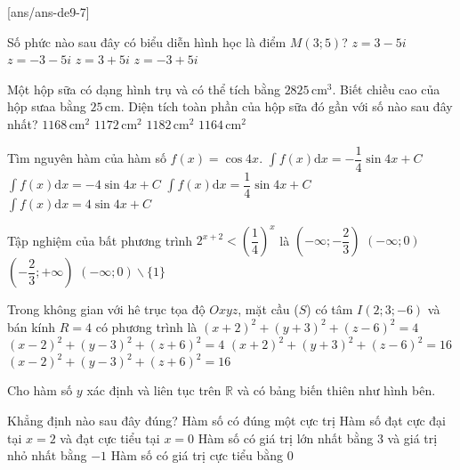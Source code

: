 
\begin{name}
	{\tenchude}
	{\tendethi}
	{\tentruong}
	{\thoigian}
\end{name}
[ans/ans-de9-7]

\begin{ex}%
Số phức nào sau đây có biểu diễn hình học là điểm $M(3; 5)$?
\choice
{$z=3-5 i$}
{$z=-3-5 i$}
{\True $z=3+5 i$}
{$z=-3+5 i$}

\end{ex}
\begin{ex}%
Một hộp sữa có dạng hình trụ và có thể tích bằng $2825\mathrm{\,cm}^3$. Biết chiều cao của hộp sưaa bằng $25\mathrm{\,cm}$. Diện tích toàn phần của hộp sữa đó gần với số nào sau đây nhất?
\choice
{\True $1168\mathrm{\,cm}^2$}
{$1172\mathrm{\,cm}^2$}
{$1182\mathrm{\,cm}^2$}
{$1164\mathrm{\,cm}^2$}

\end{ex}
\begin{ex}%
Tìm nguyên hàm của hàm số $f(x)=\cos 4 x$.
\choice
{$\displaystyle\int f(x) \mathrm{d} x=-\dfrac{1}{4} \sin 4 x+C$}
{$\displaystyle\int f(x) \mathrm{d} x=-4\sin 4 x+C$}
{\True $\displaystyle\int f(x) \mathrm{d} x=\dfrac{1}{4} \sin 4 x+C$}
{$\displaystyle\int f(x) \mathrm{d} x=4\sin 4 x+C$}

\end{ex}
\begin{ex}%
Tập nghiệm của bất phương trình $2^{x+2}<\left(\dfrac{1}{4}\right)^{x}$ là
\choice
{\True $\left(-\infty;-\dfrac{2}{3}\right)$}
{$(-\infty; 0)$}
{$\left(-\dfrac{2}{3};+\infty\right)$}
{$(-\infty; 0) \backslash\{1\}$}

\end{ex}
\begin{ex}%
Trong không gian với hê trục tọa độ $O x y z$, mặt cầu ($S$) có tâm $I(2; 3;-6)$ và bán kính $R=4$ có phương trình là
\choice
{$(x+2)^2+(y+3)^2+(z-6)^2=4$}
{$(x-2)^2+(y-3)^2+(z+6)^2=4$}
{$(x+2)^2+(y+3)^2+(z-6)^2=16$}
{\True $(x-2)^2+(y-3)^2+(z+6)^2=16$}

\end{ex}
\begin{ex}%
Cho hàm số $y$ xác định và liên tục trên $\mathbb{R}$ và có bảng biến thiên như hình bên. 
\begin{center}
\end{center}

Khẳng định nào sau đây đúng?
\choice
{Hàm số có đúng một cực trị}
{\True Hàm số đạt cực đại tại $x=2$ và đạt cực tiểu tại $x=0$}
{Hàm số có giá trị lớn nhất bằng 3 và giá trị nhỏ nhất bằng $-1$}
{Hàm số có giá trị cực tiểu bằng 0}

\end{ex}
